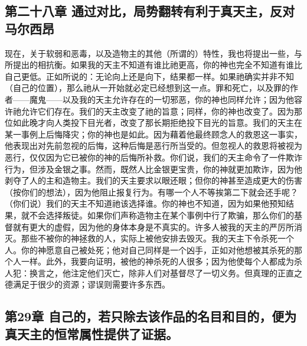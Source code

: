 
\subsection{第二十八章 通过对比，局势翻转有利于真天主，反对马尔西昂}

现在，关于软弱和恶毒，以及造物主的其他（所谓的）特性，我也将提出一些，与所提出的相抗衡。如果我的天主不知道有谁比祂更高，你的神也完全不知道有谁比自己更低。正如所说的：无论向上还是向下，结果都一样。如果祂确实并非不知（自己的位置），那么祂从一开始就必定已经想到这一点。罪和死亡，以及罪的作者——魔鬼——以及我的天主允许存在的一切邪恶，你的神也同样允许；因为他容许祂允许它们存在。我们的天主改变了祂的旨意；同样，你的神也改变了。因为那位如此晚才向人类投下目光者，改变了那长期拒绝投下目光的旨意。我们的天主在某一事例上后悔降灾；你的神也是如此。因为藉着他最终顾念人的救恩这一事实，他表现出对先前忽视的后悔，这种后悔是恶行所当受的。但忽视人的救恩将被视为恶行，仅仅因为它已被你的神的后悔所补救。你们说，我们的天主命令了一件欺诈行为，但涉及金银之事。然而，既然人比金银更宝贵，你的神就更加欺诈，因为他剥夺了人的主和造物主。我们的天主要求以眼还眼；但你的神甚至造成更大的伤害（按你们的想法），因为他阻止报复行为。有哪一个人不等挨第二下就会还手呢？（你们说）我们的天主不知道祂该选择谁。你的神也不知道，因为如果他预知结果，就不会选择叛徒。如果你们声称造物主在某个事例中行了欺骗，那么你们的基督就有更大的虚假，因为他的身体本身是不真实的。许多人被我的天主的严厉所消灭。那些不被你的神拯救的人，实际上被他安排去毁灭。我的天主下令杀死一个人。你的神愿意自己被处死；他对自己同样是一个凶手，正如对他想被其杀死的那个人一样。此外，我要向证明，被他的神杀死的人很多；因为他使每个人都成为杀人犯：换言之，他注定他们灭亡，除非人们对基督尽了一切义务。但真理的正直之德满足于很少的资源；谬误则需要许多东西。\par


\subsection{第29章 自己的，若只除去该作品的名目和目的，便为真天主的恒常属性提供了证据。}

